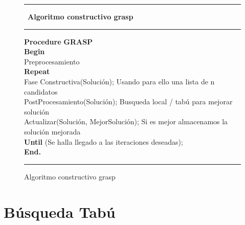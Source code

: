 \begin{figure}[h!]
{\small
 \hrule \
 {\bf\small Algoritmo constructivo grasp}
 \hrule
\begin{center}
\begin{tabbing}
\textbf{Procedure} \= \textbf{GRASP} \\
\textbf{Begin} \\
\> Preprocesamiento \\
\> \textbf{Repeat} \\
\> \> Fase Constructiva(Solución); Usando para ello una lista de n candidatos \\
\> \> PostProcesamiento(Solución); Busqueda local / tabú para mejorar solución \\
\> \> Actualizar(Solución, MejorSolución); Si es mejor almacenamos la solución mejorada \\
\> \textbf{Until} (Se halla llegado a las iteraciones deseadas); \\
\textbf{End.} \\
\end{tabbing}
\end{center}
\hrule
}
\caption{Algoritmo constructivo grasp}
\label{constructivo}
\end{figure}



\section{Búsqueda Tabú}

